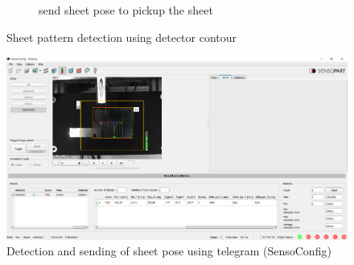 \begin{figure}[h]
\begin{subfigure}[b]{0.48\textwidth}
        \caption{send sheet pose to pickup the sheet}
        \label{subfig:sheet-taken}
    \end{subfigure}
    \caption{Sheet pattern detection using detector contour}
    \label{fig:sheet-scanning}
\end{figure}

\begin{figure}[h]
    \centering
    \includegraphics[width=\textwidth]{figures/sheet-pickup/sensoconfig.PNG}
    \caption{Detection and sending of sheet pose using telegram (SensoConfig)}
    \label{fig:sensoconfig-pattern}
\end{figure}



